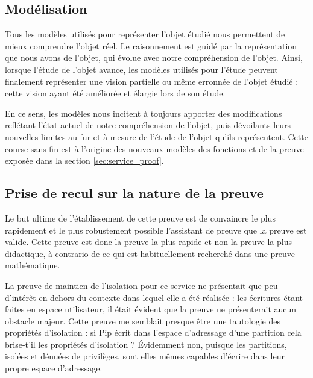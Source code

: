 		\subsection{Modélisation}

		Tous les modèles utilisés pour représenter l'objet étudié nous permettent de mieux comprendre l'objet réel. Le raisonnement est guidé par la représentation que nous avons de l'objet, qui évolue avec notre compréhension de l'objet. Ainsi, lorsque l'étude de l'objet avance, les modèles utilisés pour l'étude peuvent finalement représenter une vision partielle ou même erronnée de l'objet étudié : cette vision ayant été améliorée et élargie lors de son étude.

	En ce sens, les modèles nous incitent à toujours apporter des modifications reflétant l'état actuel de notre compréhension de l'objet, puis dévoilants leurs nouvelles limites au fur et à mesure de l'étude de l'objet qu'ils représentent. Cette course sans fin est à l'origine des nouveaux modèles des fonctions et de la preuve exposée dans la section \ref{sec:service_proof}.


		\subsection{Prise de recul sur la nature de la preuve}

		\label{sec:proof_limits}

		Le but ultime de l'établissement de cette preuve est de convaincre le plus rapidement et le plus robustement possible l'assistant de preuve que la preuve est valide. Cette preuve est donc la preuve la plus rapide et non la preuve la plus didactique, à contrario de ce qui est habituellement recherché dans une preuve mathématique.

		La preuve de maintien de l'isolation pour ce service ne présentait que peu d'intérêt en dehors du contexte dans lequel elle a été réalisée : les écritures étant faites en espace utilisateur, il était évident que la preuve ne présenterait aucun obstacle majeur. Cette preuve me semblait presque être une tautologie des propriétés d'isolation : si Pip écrit dans l'espace d'adressage d'une partition cela brise-t'il les propriétés d'isolation ? Évidemment non, puisque les partitions, isolées et dénuées de privilèges, sont elles mêmes capables d'écrire dans leur propre espace d'adressage.


